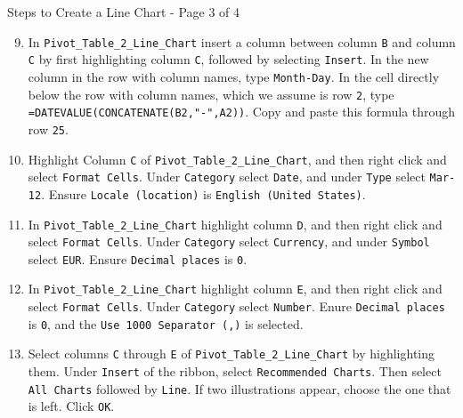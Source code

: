 \documentclass[pdf]{beamer}
\theoremstyle{remark}
\theoremstyle{definition}
\begin{document}
\begin{frame}[t]{Steps to Create a Line Chart - Page 3 of 4}
 \small 
\begin{enumerate}
  \setcounter{enumi}{8}
\item In \texttt{Pivot\_Table\_2\_Line\_Chart} insert a column between column \texttt{B} and column \texttt{C} by first highlighting column \texttt{C}, followed by selecting \texttt{Insert}. In the new column in the row with column names, type \texttt{Month-Day}.  In the cell directly below the row with column names, which we assume is row \texttt{2}, type \texttt{=DATEVALUE(CONCATENATE(B2,"-",A2))}.  Copy and paste this formula through row \texttt{25}.
\item Highlight Column \texttt{C} of \texttt{Pivot\_Table\_2\_Line\_Chart}, and then right click and select \texttt{Format Cells}.   Under \texttt{Category} select \texttt{Date}, and under \texttt{Type} select \texttt{Mar-12}.  Ensure \texttt{Locale (location)} is \texttt{English (United States)}.
\item In  \texttt{Pivot\_Table\_2\_Line\_Chart} highlight column \texttt{D}, and then right click and select \texttt{Format Cells}.   Under \texttt{Category} select \texttt{Currency}, and under \texttt{Symbol} select \texttt{EUR}. Ensure \texttt{Decimal places} is \texttt{0}.
\item In  \texttt{Pivot\_Table\_2\_Line\_Chart} highlight column \texttt{E}, and then right click and select \texttt{Format Cells}.   Under \texttt{Category} select \texttt{Number}.  Enure \texttt{Decimal places} is \texttt{0}, and the \texttt{Use 1000 Separator (,)} is selected. 
\item  Select columns \texttt{C} through \texttt{E} of  \texttt{Pivot\_Table\_2\_Line\_Chart} by highlighting them.  Under  \texttt{Insert} of the ribbon, select  \texttt{Recommended Charts}.  Then select \texttt{All Charts} followed by  \texttt{Line}.   If two illustrations appear, choose the one that is left.  Click  \texttt{OK}.
\end{enumerate}
\end{frame}
\end{document}
